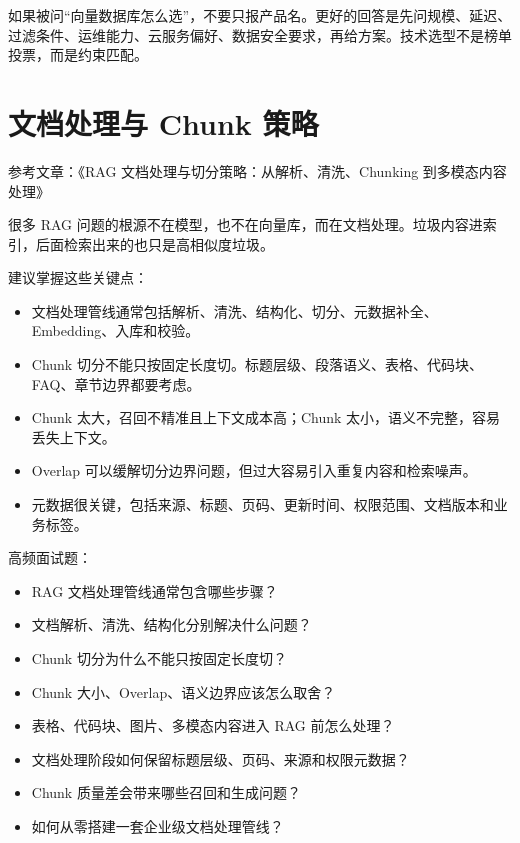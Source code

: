 \documentclass[10pt,a4paper]{ctexart}
\begin{document}
如果被问“向量数据库怎么选”，不要只报产品名。更好的回答是先问规模、延迟、过滤条件、运维能力、云服务偏好、数据安全要求，再给方案。技术选型不是榜单投票，而是约束匹配。



\section{文档处理与 Chunk 策略}


参考文章：《RAG 文档处理与切分策略：从解析、清洗、Chunking 到多模态内容处理》



很多 RAG 问题的根源不在模型，也不在向量库，而在文档处理。垃圾内容进索引，后面检索出来的也只是高相似度垃圾。



建议掌握这些关键点：


\begin{itemize}[itemsep=2pt, topsep=4pt]
  \item 文档处理管线通常包括解析、清洗、结构化、切分、元数据补全、Embedding、入库和校验。
  \item Chunk 切分不能只按固定长度切。标题层级、段落语义、表格、代码块、FAQ、章节边界都要考虑。
  \item Chunk 太大，召回不精准且上下文成本高；Chunk 太小，语义不完整，容易丢失上下文。
  \item Overlap 可以缓解切分边界问题，但过大容易引入重复内容和检索噪声。
  \item 元数据很关键，包括来源、标题、页码、更新时间、权限范围、文档版本和业务标签。
\end{itemize}


高频面试题：


\begin{itemize}[itemsep=2pt, topsep=4pt]
  \item RAG 文档处理管线通常包含哪些步骤？
  \item 文档解析、清洗、结构化分别解决什么问题？
  \item Chunk 切分为什么不能只按固定长度切？
  \item Chunk 大小、Overlap、语义边界应该怎么取舍？
  \item 表格、代码块、图片、多模态内容进入 RAG 前怎么处理？
  \item 文档处理阶段如何保留标题层级、页码、来源和权限元数据？
  \item Chunk 质量差会带来哪些召回和生成问题？
  \item 如何从零搭建一套企业级文档处理管线？
\end{itemize}
\end{document}
